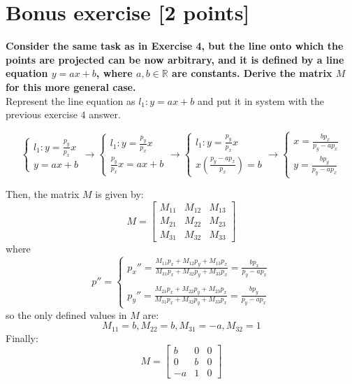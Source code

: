 \documentclass{article}
\begin{document}
\cleardoublepage
\section*{Bonus exercise [2 points]}

\textbf{Consider the same task as in Exercise 4, but the line onto which the points are projected can be now arbitrary,
    and it is defined by a line equation $y = ax + b$, where $a, b \in \mathbb{R}$ are constants. Derive the matrix $M$ for this
    more general case.} \\

Represent the line equation as $l_1 : y = ax + b$ and put it in system with the previous exercise $4$ answer.

\begin{equation*}
    \begin{cases}
        l_1: y = \frac{p_y}{p_x} x \\
        y = ax + b
    \end{cases}
    \rightarrow
    \begin{cases}
        l_1: y = \frac{p_y}{p_x} x \\
        \frac{p_y}{p_x} x = ax + b
    \end{cases}
    \rightarrow
    \begin{cases}
        l_1: y = \frac{p_y}{p_x} x \\
        x (\frac{p_y - a p_x}{p_x}) = b
    \end{cases}
    \rightarrow
    \begin{cases}
        x = \frac{bp_x}{p_y - ap_x} \\
        y = \frac{bp_y}{p_y - ap_x}
    \end{cases}
\end{equation*}

Then, the matrix $M$ is given by:
\[
    M =
    \begin{bmatrix}
        M_{11} & M_{12} & M_{13} \\
        M_{21} & M_{22} & M_{23} \\
        M_{31} & M_{32} & M_{33}
    \end{bmatrix}
\]
where
\begin{equation*}
    p'' =
    \begin{cases}
        p_x'' = \frac{M_{11}p_x + M_{12}p_y + M_{13}p_x}{M_{31}p_x + M_{32}p_y + M_{33}p_x} = \frac{bp_x}{p_y - ap_x} \\\\
        p_y'' = \frac{M_{21}p_x + M_{22}p_y + M_{23}p_x}{M_{31}p_x + M_{32}p_y + M_{33}p_x} = \frac{bp_y}{p_y - ap_x}
    \end{cases}
\end{equation*}
so the only defined values in $M$ are:
\[
    M_{11} = b, M_{22} = b, M_{31} = -a, M_{32} = 1
\]
Finally:
\[
    M =
    \begin{bmatrix}
        b  & 0 & 0 \\
        0  & b & 0 \\
        -a & 1 & 0
    \end{bmatrix}
\]
\end{document}
